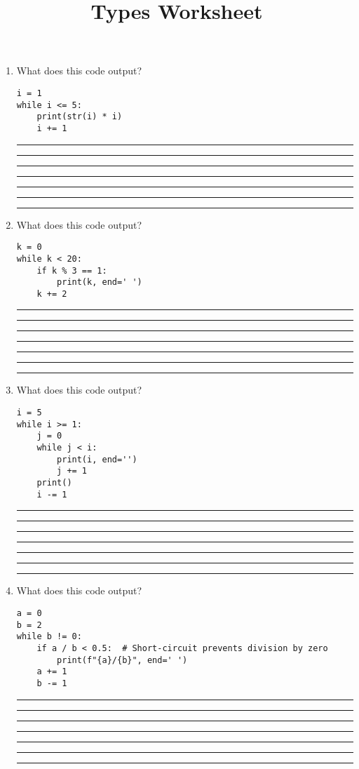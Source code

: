 \documentclass{article}
\title{\vspace{-3em}Types Worksheet\vspace{-2em}}
\begin{document}
\maketitle


    \begin{enumerate}
        \item What does this code output?
        \begin{lstlisting}
i = 1  
while i <= 5:  
    print(str(i) * i)  
    i += 1  
        \end{lstlisting}
        \rule{\linewidth}{0.4pt} %
        \rule{\linewidth}{0.4pt} %
        \rule{\linewidth}{0.4pt} %
        \rule{\linewidth}{0.4pt} %
        \rule{\linewidth}{0.4pt} %
        \rule{\linewidth}{0.4pt} %
        \rule{\linewidth}{0.4pt} %

        \item What does this code output?
        \begin{lstlisting}
k = 0  
while k < 20:  
    if k % 3 == 1:  
        print(k, end=' ')  
    k += 2  
        \end{lstlisting}

        \rule{\linewidth}{0.4pt} %
        \rule{\linewidth}{0.4pt} %
        \rule{\linewidth}{0.4pt} %
        \rule{\linewidth}{0.4pt} %
        \rule{\linewidth}{0.4pt} %
        \rule{\linewidth}{0.4pt} %
        \rule{\linewidth}{0.4pt} %

        \item What does this code output?
        \begin{lstlisting}
i = 5  
while i >= 1:  
    j = 0  
    while j < i:  
        print(i, end='')  
        j += 1  
    print()  
    i -= 1  
        \end{lstlisting}
        \rule{\linewidth}{0.4pt} %
        \rule{\linewidth}{0.4pt} %
        \rule{\linewidth}{0.4pt} %
        \rule{\linewidth}{0.4pt} %
        \rule{\linewidth}{0.4pt} %
        \rule{\linewidth}{0.4pt} %
        \rule{\linewidth}{0.4pt} %

        \item What does this code output?
        \begin{lstlisting}
a = 0  
b = 2  
while b != 0:  
    if a / b < 0.5:  # Short-circuit prevents division by zero  
        print(f"{a}/{b}", end=' ')  
    a += 1  
    b -= 1  
        \end{lstlisting}
        \rule{\linewidth}{0.4pt} %
        \rule{\linewidth}{0.4pt} %
        \rule{\linewidth}{0.4pt} %
        \rule{\linewidth}{0.4pt} %
        \rule{\linewidth}{0.4pt} %
        \rule{\linewidth}{0.4pt} %
        \rule{\linewidth}{0.4pt} %


\end{enumerate}
\end{document}
